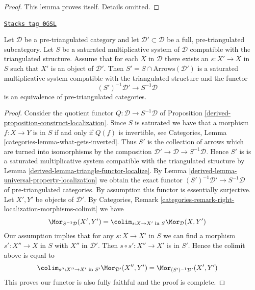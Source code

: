 \begin{proof}
This lemma proves itself. Details omitted.
\end{proof}

\begin{lemma}
\label{derived-lemma-localization-subcategory}
\href{https://stacks.math.columbia.edu/tag/0GSL}{\texttt{Stacks tag 0GSL}}

Let $\mathcal{D}$ be a pre-triangulated category and let
$\mathcal{D}' \subset \mathcal{D}$ be a full, pre-triangulated subcategory.
Let $S$ be a saturated multiplicative system of $\mathcal{D}$
compatible with the triangulated structure. Assume that for each $X$
in $\mathcal{D}$ there exists an $s : X' \to X$ in $S$ such that $X'$ is
an object of $\mathcal{D}'$. Then
$S' = S \cap \text{Arrows}(\mathcal{D}')$ is a saturated
multiplicative system compatible with the triangulated structure and
the functor
$$
(S')^{-1}\mathcal{D}' \longrightarrow S^{-1}\mathcal{D}
$$
is an equivalence of pre-triangulated categories.
\end{lemma}

\begin{proof}

Consider the quotient functor $Q : \mathcal{D} \to S^{-1}\mathcal{D}$
of Proposition \ref{derived-proposition-construct-localization}.
Since $S$ is saturated we have that a morphism $f : X \to Y$ is in
$S$ if and only if $Q(f)$ is invertible, see
Categories, Lemma \ref{categories-lemma-what-gets-inverted}.
Thus $S'$ is the collection of arrows which are turned into isomorphisms
by the composition $\mathcal{D}' \to \mathcal{D} \to S^{-1}\mathcal{D}$.
Hence $S'$ is is a saturated multiplicative system compatible with the
triangulated structure by Lemma \ref{derived-lemma-triangle-functor-localize}.
By Lemma \ref{derived-lemma-universal-property-localization} we obtain the
exact functor $(S')^{-1}\mathcal{D}' \to S^{-1}\mathcal{D}$ of pre-triangulated
categories. By assumption this functor is essentially surjective.
Let $X', Y'$ be objects of $\mathcal{D}'$. By Categories, Remark
\ref{categories-remark-right-localization-morphisms-colimit} we have
$$
\Mor_{S^{-1}\mathcal{D}}(X', Y') =
\colim_{s : X \to X'\text{ in }S} \Mor_\mathcal{D}(X, Y')
$$
Our assumption implies that for any $s : X \to X'$ in $S$ we can
find a morphism $s' : X'' \to X$ in $S$ with $X''$ in $\mathcal{D}'$.
Then $s \circ s' : X'' \to X'$ is in $S'$. Hence the colimit above is
equal to
$$
\colim_{s'' : X'' \to X'\text{ in }S'} \Mor_{\mathcal{D}'}(X'', Y') =
\Mor_{(S')^{-1}\mathcal{D}'}(X', Y')
$$
This proves our functor is also fully faithful and the proof is complete.
\end{proof}

